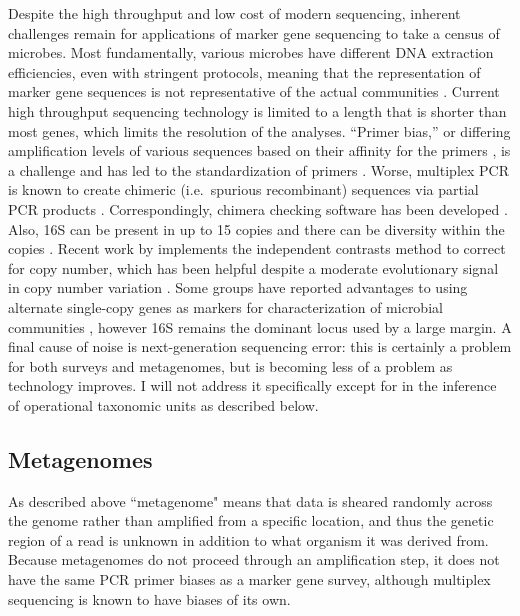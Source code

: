 \documentclass{amsart}
\begin{document}
Despite the high throughput and low cost of modern sequencing, inherent challenges remain for applications of marker gene sequencing to take a census of microbes.
Most fundamentally, various microbes have different DNA extraction efficiencies, even with stringent protocols, meaning that the representation of marker gene sequences is not representative of the actual communities \citep{morgan2010metagenomic}.
Current high throughput sequencing technology is limited to a length that is shorter than most genes, which limits the resolution of the analyses.
``Primer bias,'' or differing amplification levels of various sequences based on their affinity for the primers \citep{suzuki1996bias,polz1998bias}, is a challenge and has led to the standardization of primers \citep{methe2012framework}.
Worse, multiplex PCR is known to create chimeric (i.e.\ spurious recombinant) sequences via partial PCR products \citep{hugenholtz2003chimeric,ashelford2005least,haas2011chimeric,schloss2011reducing}.
Correspondingly, chimera checking software has been developed \citep[including][]{ashelford2006new,edgar2011uchime}.
Also, 16S can be present in up to 15 copies and there can be diversity within the copies \citep{klappenbach2001rrndb}.
Recent work by \citet{kembel2012incorporating} implements the independent contrasts \citep{felsenstein1985phylogenies} method to correct for copy number, which has been helpful despite a moderate evolutionary signal in copy number variation \citep{klappenbach2000rrna}.
Some groups have reported advantages to using alternate single-copy genes as markers for characterization of microbial communities \citep[e.g.][]{case2007rpob,mcnabb2004hsp65}, however 16S remains the dominant locus used by a large margin.
A final cause of noise is next-generation sequencing error: this is certainly a problem for both surveys and metagenomes, but is becoming less of a problem as technology improves.
I will not address it specifically except for in the inference of operational taxonomic units as described below.

\subsection{Metagenomes}
As described above ``metagenome" means that data is sheared randomly across the genome rather than amplified from a specific location, and thus the genetic region of a read is unknown in addition to what organism it was derived from.
Because metagenomes do not proceed through an amplification step, it does not have the same PCR primer biases as a marker gene survey, although multiplex sequencing is known to have biases of its own.
\end{document}
